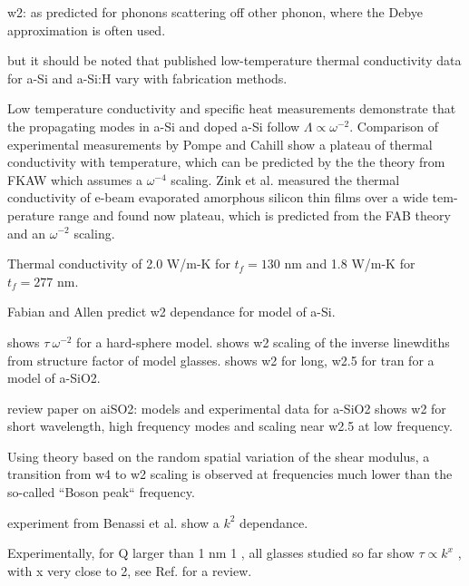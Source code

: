 \documentclass[aps,prb,twocolumn,superscriptaddress,footinbib,amsmath,amssymb,floatfix]{revtex4}
\begin{document}
w2: as predicted for phonons scattering off other phonon, where 
the Debye approximation is often used. 

but it should be noted that published low-temperature
thermal conductivity data for a-Si and a-Si:H vary with
fabrication methods.
\cite{pompe_thermal_1988,cahill_thermal_1989,cahill_thermal_1994,
zink_thermal_2006} 

Low temperature conductivity and specific heat measurements demonstrate 
that the propagating modes in a-Si and doped a-Si follow 
$\Lambda \propto \omega^{-2}$.
\cite{zink_thermal_2006,zink_excess_2006} 
Comparison of experimental measurements by 
Pompe\cite{pompe_thermal_1988} and Cahill
\cite{cahill_thermal_1989,cahill_thermal_1994} show a plateau of 
thermal conductivity with temperature, 
which can be predicted by the the theory from FKAW which assumes a 
$\omega^{-4}$ scaling.\cite{feldman_thermal_1993}  
Zink et al. measured the thermal conductivity of e-beam
evaporated amorphous silicon thin films over a wide tem-
perature range and found now plateau, which is predicted from the 
FAB theory and an $\omega^{-2}$ scaling.\cite{feldman_numerical_1999}   





Thermal conductivity of 2.0 W/m-K for $t_f = 130$ nm and 1.8 W/m-K 
for $t_f = 277$ nm.\cite{zink_thermal_2006} 



Fabian and Allen predict w2 dependance for model of a-Si.
\cite{fabian_theory_1999}

shows $\tau ~ \omega^{-2}$ for a hard-sphere model.
\cite{gotze_evolution_2000} 
shows w2 scaling of the inverse linewdiths from structure factor of model 
glasses.\cite{shintani_universal_2008}
shows w2 for long, w2.5 for tran for a model of a-SiO2.
\cite{horbach_high_2001}

review paper on aiSO2: models and experimental data for a-SiO2 shows w2 for 
short wavelength, high frequency modes and scaling near w2.5 at low frequency.
\cite{ruocco_high-frequency_2001} 

Using theory based on the random spatial variation of the shear modulus, 
a transition from w4 to w2 scaling is observed at frequencies much lower
than the so-called ``Boson peak`` frequency.
\cite{schirmacher_acoustic_2007}

experiment from Benassi et al. show a $k^2$ 
dependance.\cite{benassi_evidence_1996}

Experimentally, for Q larger
than 1 nm 1 , all glasses studied so far show $\tau \propto k^x$ , with x
very close to 2, see Ref.  for a review. 
\end{document}
